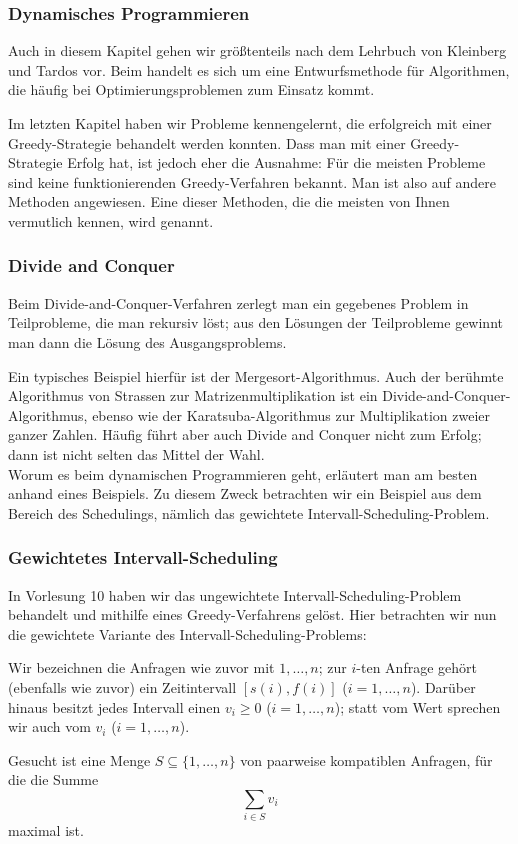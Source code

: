 \documentclass[smaller]{beamer}
\begin{document}
\begin{frame}
 \frametitle{Dynamisches Programmieren}
 Auch in diesem Kapitel gehen wir größtenteils nach dem Lehrbuch von Kleinberg und Tardos vor. Beim  handelt es sich um eine Entwurfsmethode für Algorithmen, die \alert{häufig bei Optimierungsproblemen} zum Einsatz kommt. \\ \medskip

 Im letzten Kapitel haben wir Probleme kennengelernt, die erfolgreich mit einer Greedy-Strategie behandelt werden konnten. Dass man mit einer Greedy-Strategie Erfolg hat, ist jedoch eher die Ausnahme: \alert{Für die meisten Probleme sind keine funktionierenden Greedy-Verfahren bekannt}. Man ist also auf andere Methoden angewiesen. Eine dieser Methoden, die die meisten von Ihnen vermutlich kennen, wird  genannt.
\end{frame}

\begin{frame}
 \frametitle{Divide and Conquer}
 Beim \alert{Divide-and-Conquer-Verfahren} zerlegt man ein gegebenes Problem in Teilprobleme, die man rekursiv löst; aus den Lösungen der Teilprobleme gewinnt man dann die Lösung des Ausgangsproblems. \\ \medskip
 
 Ein typisches Beispiel hierfür ist der \alert{Mergesort-Algorithmus}. Auch der berühmte \alert{Algorithmus von Strassen} zur Matrizenmultiplikation ist ein Divide-and-Conquer-Algorithmus, ebenso wie der \alert{Karatsuba-Algorithmus} zur Multiplikation zweier ganzer Zahlen. Häufig führt aber auch Divide and Conquer nicht zum Erfolg; dann ist nicht selten  das Mittel der Wahl. \\ \medskip
 Worum es beim dynamischen Programmieren geht, erläutert man am besten anhand eines Beispiels. Zu diesem Zweck betrachten wir ein Beispiel aus dem Bereich des Schedulings, nämlich das \alert{gewichtete Intervall-Scheduling-Problem}.
\end{frame}

\begin{frame}
\frametitle{Gewichtetes Intervall-Scheduling}
In Vorlesung 10 haben wir das \alert{ungewichtete} Intervall-Scheduling-Problem behandelt und mithilfe eines Greedy-Verfahrens gelöst. \alert{Hier betrachten wir nun die gewichtete Variante des Intervall-Scheduling-Problems}: \\ \medskip
 
Wir bezeichnen die Anfragen wie zuvor mit $1,\ldots,n$; zur $i$-ten Anfrage gehört (ebenfalls wie zuvor) ein Zeitintervall $[s(i),f(i)]$ ($i=1,\ldots,n$). Darüber hinaus besitzt jedes Intervall einen  $v_i \geq 0$ ($i=1,\ldots,n$); statt vom Wert sprechen wir auch vom  $v_i$ ($i=1,\ldots,n$). \\ \medskip

Gesucht ist eine Menge $S \subseteq \bigl\{ 1,\ldots,n \bigr\}$ von paarweise kompatiblen Anfragen, \alert{für die die Summe}
\[
\sum\limits_{i \in S}{v_i}
\]
\alert{maximal ist}.
\end{frame}
\end{document}
